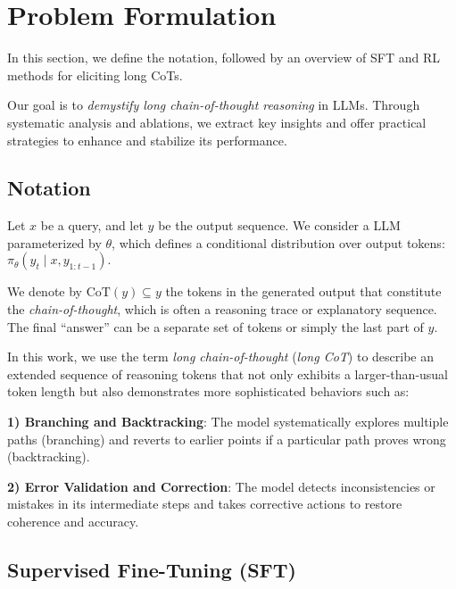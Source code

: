 \section{Problem Formulation}
\label{sec:problemform}

In this section, we define the notation, followed by an overview of SFT and RL methods for eliciting long CoTs.

\begin{tcolorbox}[colback=lightgray!10, colframe=black, title={Research Aim}]
Our goal is to \textit{demystify long chain-of-thought reasoning} in LLMs. Through systematic analysis and ablations, we extract key insights and offer practical strategies to enhance and stabilize its performance.
\end{tcolorbox}
\vspace{-10pt}


\subsection{Notation}
\label{sec:notation}

Let \(x\) be a query, and let \(y\) be the output sequence. We consider a LLM parameterized by \(\theta\), which defines a conditional distribution over output tokens: $
\pi_\theta(y_t \mid x, y_{1:t-1}).
$

We denote by \(\text{CoT}(y)\subseteq y\) the tokens in the generated output that constitute the \emph{chain-of-thought}, which is often a reasoning trace or explanatory sequence. The final “answer” can be a separate set of tokens or simply the last part of \(y\).

In this work, we use the term \emph{long chain-of-thought} (\emph{long CoT}) to describe an extended sequence of reasoning tokens that not only exhibits a larger-than-usual token length but also demonstrates more sophisticated behaviors such as:

\noindent\textbf{1) Branching and Backtracking}: The model systematically explores multiple paths (branching) and reverts to earlier points if a particular path proves wrong (backtracking).

\noindent\textbf{2) Error Validation and Correction}: The model detects inconsistencies or mistakes in its intermediate steps and takes corrective actions to restore coherence and accuracy.


\subsection{Supervised Fine-Tuning (SFT)}
\label{sec:sft}

